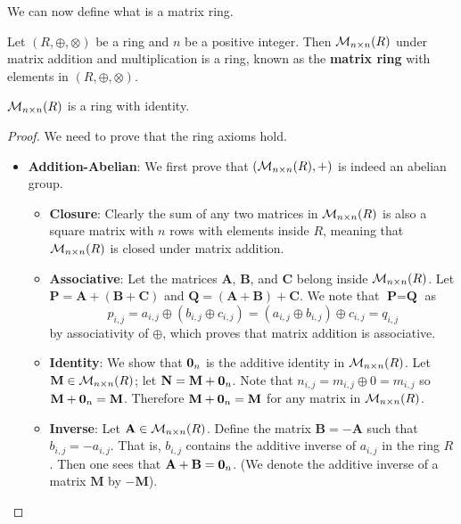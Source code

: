 We can now define what is a matrix ring.
\begin{definition}
    Let $(R, \oplus, \otimes)$ be a ring and $n$ be a positive integer. Then $\mathcal{M}_{n\times n}(R)$ under matrix addition and multiplication is a ring, known as the \textbf{matrix ring} with elements in $(R, \oplus, \otimes)$.
\end{definition}
\begin{proposition}
    $\mathcal{M}_{n\times n}(R)$ is a ring with identity.
\end{proposition}
\begin{proof}
    We need to prove that the ring axioms hold.
    \begin{itemize}
        \item \textbf{Addition-Abelian}: We first prove that $(\mathcal{M}_{n\times n}(R), +)$ is indeed an abelian group.
        \begin{itemize}
            \item \textbf{Closure}: Clearly the sum of any two matrices in $\mathcal{M}_{n\times n}(R)$ is also a square matrix with $n$ rows with elements inside $R$, meaning that $\mathcal{M}_{n\times n}(R)$ is closed under matrix addition.

            \item \textbf{Associative}: Let the matrices $\textbf{A}$, $\textbf{B}$, and $\textbf{C}$ belong inside $\mathcal{M}_{n\times n}(R)$. Let $\textbf{P} = \textbf{A} + (\textbf{B} + \textbf{C})$ and $\textbf{Q} = (\textbf{A} + \textbf{B}) + \textbf{C}$. We note that $\textbf{P} = \textbf{Q}$ as
            \[
                p_{i,j} = a_{i,j} \oplus (b_{i,j} \oplus c_{i,j}) = (a_{i,j} \oplus b_{i,j}) \oplus c_{i,j} = q_{i,j}
            \]
            by associativity of $\oplus$, which proves that matrix addition is associative.
    
            \item \textbf{Identity}: We show that $\textbf{0}_{n}$ is the additive identity in $\mathcal{M}_{n\times n}(R)$. Let $\textbf{M} \in \mathcal{M}_{n\times n}(R)$; let $\textbf{N} = \textbf{M} + \textbf{0}_{n}$. Note that $n_{i,j} = m_{i,j} \oplus 0 = m_{i,j}$ so $\textbf{M} + \textbf{0}_{n} = \textbf{M}$. Therefore $\textbf{M} + \textbf{0}_{n} = \textbf{M}$ for any matrix in $\mathcal{M}_{n\times n}(R)$.
            
            \item \textbf{Inverse}: Let $\textbf{A} \in \mathcal{M}_{n\times n}(R)$. Define the matrix $\textbf{B} = -\textbf{A}$ such that $b_{i,j} = -a_{i,j}$. That is, $b_{i,j}$ contains the additive inverse of $a_{i,j}$ in the ring $R$. Then one sees that $\textbf{A} + \textbf{B} = \textbf{0}_{n}$. (We denote the additive inverse of a matrix $\textbf{M}$ by $-\textbf{M}$).


\end{itemize}
\end{itemize}
\end{proof}
